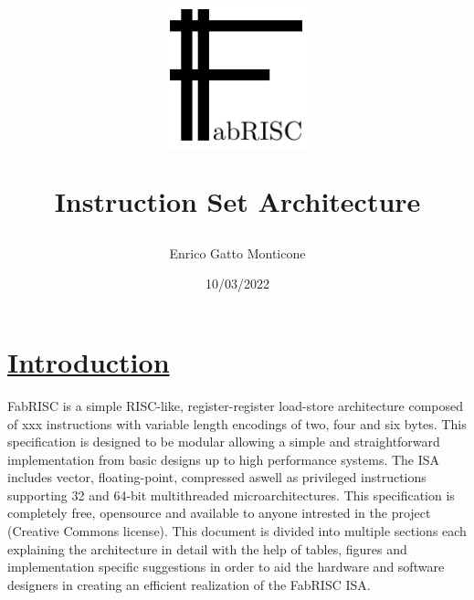 \documentclass{article}
\title{\includegraphics[width=4cm]{LOGO.pdf} \par\noindent\huge{Instruction Set Architecture}}
\date{10/03/2022}
\author{Enrico Gatto Monticone}
\begin{document}
	\maketitle
	\newpage

	\tableofcontents
	\listoffigures
	\newpage

    \section[Introduction]{\LARGE\underline{Introduction}}

        FabRISC is a simple RISC-like, register-register load-store architecture composed of xxx instructions with variable length encodings of two, four and six bytes. This specification is designed to be modular allowing a simple and straightforward implementation from basic designs up to high performance systems. The ISA includes vector, floating-point, compressed aswell as privileged instructions supporting 32 and 64-bit multithreaded microarchitectures. This specification is completely free, opensource and available to anyone intrested in the project (Creative Commons license). This document is divided into multiple sections each explaining the architecture in detail with the help of tables, figures and implementation specific suggestions in order to aid the hardware and software designers in creating an efficient realization of the FabRISC ISA.
\end{document}
